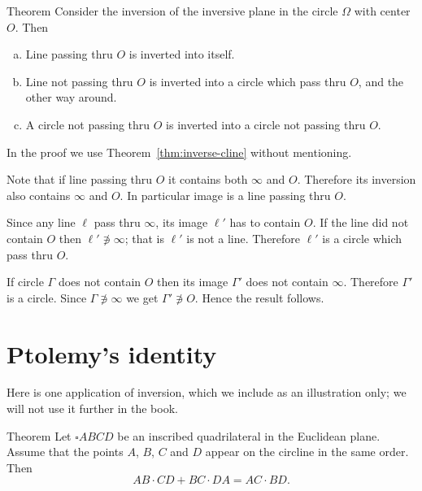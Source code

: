 \begin{thm}{Theorem}\label{thm:inverse}
Consider the inversion of the inversive plane 
in the circle $\Omega$ with center $O$. 
Then 
\begin{enumerate}[(a)]
\item\label{thm:inverse:line-line}
Line passing thru $O$ is inverted into itself.
\item\label{thm:inverse:line} 
Line not passing thru $O$ is inverted into a circle which pass thru $O$, and the other way around.
\item\label{thm:inverse:circle} 
A circle not passing thru $O$ 
is inverted into a circle not passing thru $O$. 
\end{enumerate}
\end{thm}

In the proof we use Theorem~\ref{thm:inverse-cline} without mentioning.

Note that if line passing thru $O$ it contains both $\infty$ and $O$.
Therefore its inversion also contains $\infty$ and $O$.
In particular image is a line passing thru $O$.

Since any line $\ell$ pass thru $\infty$, its image $\ell'$ has to contain $O$.
If the line did not contain $O$ then $\ell'\not\ni \infty$;
that is $\ell'$ is not a line.
Therefore $\ell'$ is a circle which pass thru $O$. 

If circle $\Gamma$ does not contain $O$ 
then its image $\Gamma'$ does not contain $\infty$.
Therefore $\Gamma'$ is a circle.
Since  $\Gamma\not\ni\infty$ we get $\Gamma' \not\ni O$.
Hence the result follows.
\qeds

\section*{Ptolemy's identity}

Here is one application of inversion,
which we include as an illustration only;
we will not use it further in the book.

\begin{thm}{Theorem}
Let $\square ABCD$ be an inscribed quadrilateral in the Euclidean plane.
Assume that the points $A$, $B$, $C$ and $D$ appear on the circline in the same order.
Then 
$$ AB\cdot CD+ BC\cdot DA=AC\cdot BD.$$

\end{thm}

